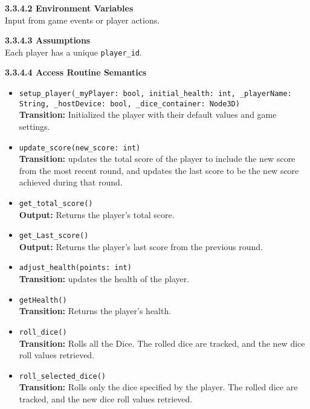 \documentclass[12pt, titlepage]{article}
\begin{document}
\textbf{3.3.4.2 Environment Variables}\\
Input from game events or player actions.

\textbf{3.3.4.3 Assumptions}\\
Each player has a unique \texttt{player\_id}.

\textbf{3.3.4.4 Access Routine Semantics}
\begin{itemize}

	\item \texttt{setup\_player(\_myPlayer: bool, initial\_health: int, \_playerName: String, \_hostDevice: bool, \_dice\_container: Node3D)}\\
	 \textbf{Transition:} Initialized the player with their default values and game settings.
	
    \item \texttt{update\_score(new\_score: int)}\\
    	\textbf{Transition:} updates the total score of the player to include the new score from the most recent round, and updates the last score to be the new score achieved during that round.
    
    \item \texttt{get\_total\_score()}\\
    \textbf{Output:} Returns the player's total score.
        	
    \item \texttt{get\_Last\_score()}\\
    \textbf{Output:} Returns the player's last score from the previous round.
    
    \item \texttt{adjust\_health(points: int)}\\
    \textbf{Transition:} updates the health of the player.
    
    \item \texttt{getHealth()}\\
    \textbf{Transition:} Returns the player's health.
    
    \item \texttt{roll\_dice()}\\
    \textbf{Transition:} Rolls all the Dice. The rolled dice are tracked, and the new dice roll values retrieved.
    
    \item \texttt{roll\_selected\_dice()}\\
    \textbf{Transition:} Rolls only the dice specified by the player. The rolled dice are tracked, and the new dice roll values retrieved.
    

\end{itemize}
\end{document}
